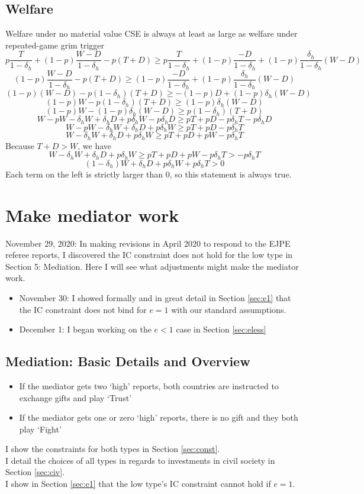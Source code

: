 \documentclass[12pt]{article}
\newcommand{\de}{\delta}
\begin{document}
\subsection{Welfare}
Welfare under no material value CSE is always at least as large as welfare under repeated-game grim trigger
\[
  p\frac{T}{1-\de_h} + (1-p)\frac{W-D}{1-\de_h} - p(T+D) \geq p\frac{T}{1-\de_h} + (1-p)\frac{-D}{1-\de_h} + (1-p)\frac{\de_h}{1-\de_h}(W-D)
\]
\[
  (1-p)\frac{W-D}{1-\de_h} - p(T+D) \geq (1-p)\frac{-D}{1-\de_h} + (1-p)\frac{\de_h}{1-\de_h}(W-D)
\]
\[
  (1-p)(W-D) - p(1-\de_h)(T+D) \geq -(1-p)D + (1-p)\de_h(W-D)
\]
\[
  (1-p)W - p(1-\de_h)(T+D) \geq (1-p)\de_h(W-D)
\]
\[
  (1-p)W -(1-p)\de_h(W-D)\geq  p(1-\de_h)(T+D) 
\]
\[
  W-pW - \de_hW+\de_hD +p\de_hW-p\de_hD\geq  pT + pD -p\de_hT - p\de_hD 
\]
\[
  W-pW - \de_hW+\de_hD +p\de_hW \geq  pT + pD -p\de_hT 
\]
\[
  W - \de_hW+\de_hD +p\de_hW \geq  pT + pD + pW -p\de_hT 
\]
Because $T +D > W$, we have 
\[
  W - \de_hW+\de_hD +p\de_hW \geq  pT + pD + pW -p\de_hT > -p\de_hT 
\]
\[
  (1-\de_h)W +\de_hD +p\de_hW + p\de_hT > 0 
\]
Each term on the left is strictly larger than 0, so this statement is always true.

\section{Make mediator work}
November 29, 2020: In making revisions in April 2020 to respond to the EJPE referee reports, I discovered the IC constraint does not hold for the low type in Section 5: Mediation. Here I will see what adjustments might make the mediator work.
\begin{itemize}
	\item November 30: I showed formally and in great detail in Section \ref{sec:e1} that the IC constraint does not bind for $e=1$ with our standard assumptions.
	\item December 1: I began working on the $e < 1$ case in Section \ref{sec:eless}
\end{itemize}

\subsection{Mediation: Basic Details and Overview}
\begin{itemize}
	\item If the mediator gets two `high' reports, both countries are instructed to exchange gifts and play `Trust'
	\item If the mediator gets one or zero `high' reports, there is no gift and they both play `Fight'
\end{itemize}
I show the constraints for both types in Section \ref{sec:const}.\\
I detail the choices of all types in regards to investments in civil society in Section \ref{sec:civ}.\\
I show in Section \ref{sec:e1} that the low type's IC constraint cannot hold if $e=1$.\\
\end{document}
